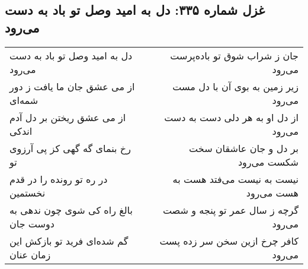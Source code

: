 \begin{center}
\section*{غزل شماره ۳۳۵: دل به امید وصل تو باد به دست می‌رود}
\label{sec:335}
\begin{longtable}{l p{0.5cm} r}
دل به امید وصل تو باد به دست می‌رود
&&
جان ز شراب شوق تو باده‌پرست می‌رود
\\
از می عشق جان ما یافت ز دور شمه‌ای
&&
زیر زمین به بوی آن با دل مست می‌رود
\\
از می عشق ریختن بر دل آدم اندکی
&&
از دل او به هر دلی دست به دست می‌رود
\\
رخ بنمای گه گهی کز پی آرزوی تو
&&
بر دل و جان عاشقان سخت شکست می‌رود
\\
در ره تو رونده را در قدم نخستمین
&&
نیست به نیست می‌فتد هست به هست می‌رود
\\
بالغ راه کی شوی چون ندهی به دوست جان
&&
گرچه ز سال عمر تو پنجه و شصت می‌رود
\\
گم شده‌ای فرید تو بازکش این زمان عنان
&&
کافر چرخ ازین سخن سر زده پست می‌رود
\\
\end{longtable}
\end{center}
